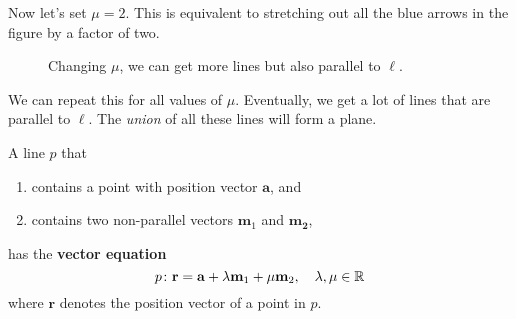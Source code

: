 \documentclass[12pt]{article}
\renewcommand{\vec}{\mathbf}
\begin{document}
\begin{disc}
	Now let's set \(\mu = 2\).
	This is equivalent to stretching out all the blue arrows in the figure by a factor of two.
	\begin{figure}[H]
		\centering
		\caption{Changing \(\mu\), we can get more lines but also parallel to \(\ell\).}
	\end{figure}
	
	We can repeat this for all values of \(\mu\).
	Eventually, we get a lot of lines that are parallel to \(\ell\).
	The \emph{union} of all these lines  will form a plane.
\end{disc}

\begin{defn}
	A line \(p\) that 
	\begin{enumerate}
		\item contains a point with position vector \(\vec{a}\), and
		\item contains two non-parallel vectors \(\vec{m}_1\) and \(\vec{m_2}\),
	\end{enumerate}
	has the \textbf{vector equation}
	\[ p \colon \vec{r} = \vec{a} + \lambda \vec{m}_1 + \mu \vec{m}_2, \quad \lambda, \mu \in \R \] 
	where \(\vec{r}\) denotes the position vector of a point in \(p\).
\end{defn}
\end{document}

